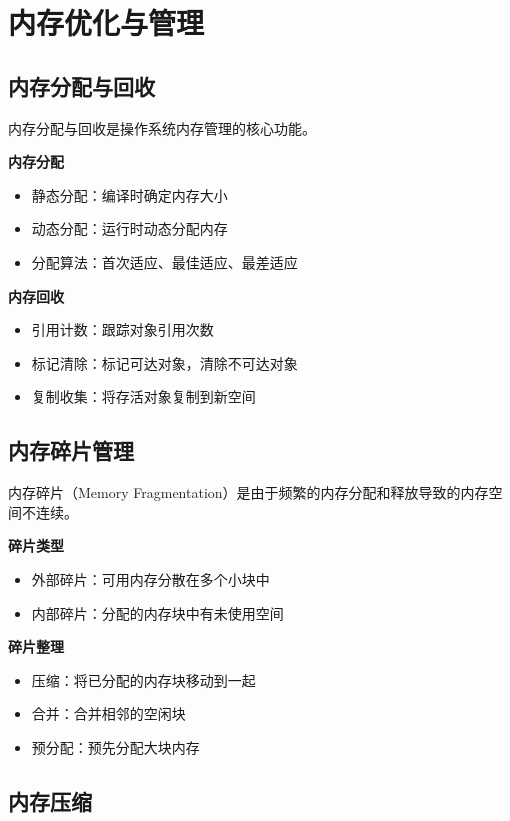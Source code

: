 \documentclass{article}
\begin{document}
\section{内存优化与管理}

\subsection{内存分配与回收}

内存分配与回收是操作系统内存管理的核心功能。

\textbf{内存分配}
\begin{itemize}
    \item 静态分配：编译时确定内存大小
    \item 动态分配：运行时动态分配内存
    \item 分配算法：首次适应、最佳适应、最差适应
\end{itemize}

\textbf{内存回收}
\begin{itemize}
    \item 引用计数：跟踪对象引用次数
    \item 标记清除：标记可达对象，清除不可达对象
    \item 复制收集：将存活对象复制到新空间
\end{itemize}

\subsection{内存碎片管理}

内存碎片（Memory Fragmentation）是由于频繁的内存分配和释放导致的内存空间不连续。

\textbf{碎片类型}
\begin{itemize}
    \item 外部碎片：可用内存分散在多个小块中
    \item 内部碎片：分配的内存块中有未使用空间
\end{itemize}

\textbf{碎片整理}
\begin{itemize}
    \item 压缩：将已分配的内存块移动到一起
    \item 合并：合并相邻的空闲块
    \item 预分配：预先分配大块内存
\end{itemize}

\subsection{内存压缩}
\end{document}
